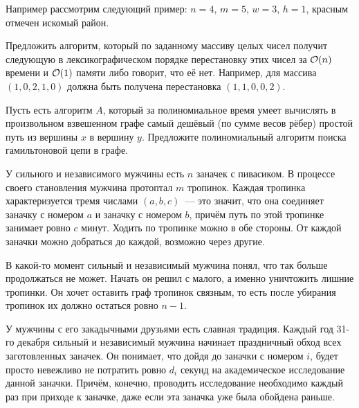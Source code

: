 \documentclass[addpoints]{exam}
\begin{document}
\begin{questions}
Например рассмотрим следующий пример: $n=4$, $m=5$, $w=3$, $h=1$, красным отмечен искомый район.

\begin{center}
\end{center}

%

\question[2] Предложить алгоритм, который по заданному массиву целых чисел получит следующую в лексикографическом порядке перестановку этих чисел за $\mathcal{O}(n)$ времени и $\mathcal{O}(1)$ памяти либо говорит, что её нет. Например, для массива $(1,0,2,1,0)$ должна быть получена перестановка $(1,1,0,0,2)$.

\question[3] Пусть есть алгоритм $A$, который за полиномиальное время умеет вычислять в произвольном взвешенном графе самый дешёвый (по сумме весов рёбер) простой путь из вершины $x$ в вершину $y$. Предложите полиномиальный алгоритм поиска гамильтоновой цепи в графе.

\question[3] У сильного и независимого мужчины есть $n$ заначек с пивасиком. В процессе своего становления мужчина протоптал $m$ тропинок. Каждая тропинка характеризуется тремя числами $(a,b,c)$~--- это значит, что она соединяет заначку с номером $a$ и заначку с номером $b$, причём путь по этой тропинке занимает ровно $c$ минут. Ходить по тропинке можно в обе стороны. От каждой заначки можно добраться до каждой, возможно через другие.

В какой-то момент сильный и независимый мужчина понял, что так больше продолжаться не может. Начать он решил с малого, а именно уничтожить лишние тропинки. Он хочет оставить граф тропинок связным, то есть после убирания тропинок их должно остаться ровно $n-1$.

У мужчины с его закадычными друзьями есть славная традиция. Каждый год 31-го декабря сильный и независимый мужчина начинает праздничный обход всех заготовленных заначек. Он понимает, что дойдя до заначки с номером $i$, будет просто невежливо не потратить ровно $d_i$ секунд на академическое исследование данной заначки. Причём, конечно, проводить исследование необходимо каждый раз при приходе к заначке, даже если эта заначка уже была обойдена раньше. 


\end{questions}
\end{document}
